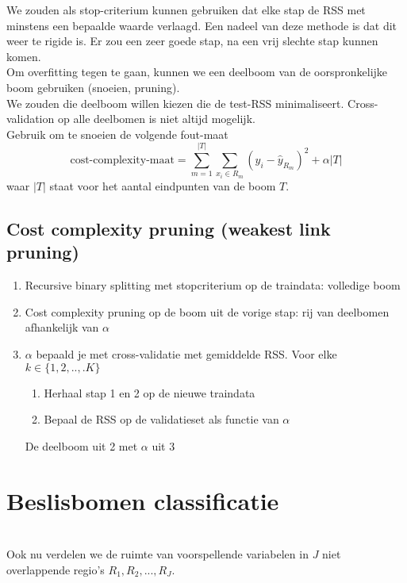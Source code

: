 {\noindent We zouden als stop-criterium kunnen gebruiken dat elke stap
de RSS met minstens een bepaalde waarde verlaagd. Een
nadeel van deze methode is dat dit weer te rigide is. Er zou
een zeer goede stap, na een vrij slechte stap kunnen komen.\\

Om overfitting tegen te gaan, kunnen we een deelboom van
de oorspronkelijke boom gebruiken (snoeien, pruning).\\

\noindent We zouden die deelboom willen kiezen die de test-RSS
minimaliseert. Cross-validation op alle deelbomen is niet altijd
mogelijk.\\

\noindent Gebruik om te snoeien de volgende fout-maat
\[\textrm{cost-complexity-maat}=\sum\limits_{m=1}^{|T|}\sum\limits_{x_i\in R_m}(y_i-\hat{y}_{R_m})^2+\alpha|T|\]
waar $|T|$ staat voor het aantal eindpunten van de boom $T$.\\

\subsection{Cost complexity pruning (weakest link pruning)}
\begin{enumerate}
    \item Recursive binary splitting met stopcriterium op de traindata: volledige boom
    \item Cost complexity pruning op de boom uit de vorige stap: rij van deelbomen afhankelijk van $\alpha$
    \item $\alpha$ bepaald je met cross-validatie met gemiddelde RSS. Voor elke $k \in \{1,2,..,.K\}$
    \begin{enumerate}
        \item Herhaal stap 1 en 2 op de nieuwe traindata
        \item Bepaal de RSS op de validatieset als functie van $\alpha$
    \end{enumerate}
    De deelboom uit 2 met $\alpha$ uit 3
\end{enumerate}

\section{Beslisbomen classificatie}\\
Ook nu verdelen we de ruimte van voorspellende variabelen in $J$ niet overlappende regio's $R_1,R_2,...,R_J$.\\

}
